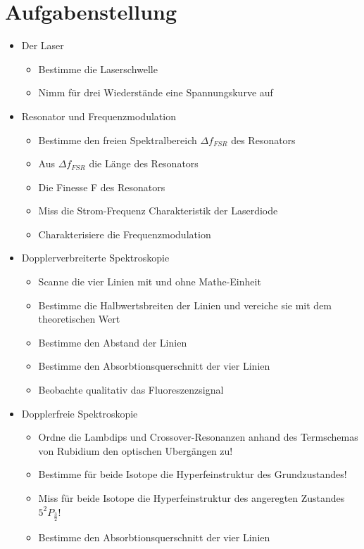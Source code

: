 \documentclass[12pt]{article}
\begin{document}
\section{Aufgabenstellung}
\begin{itemize}
 \item Der Laser
  \begin{itemize}
   \item Bestimme die Laserschwelle 
   \item Nimm für drei Wiederstände eine Spannungskurve auf
  \end{itemize}
 \item Resonator und Frequenzmodulation
  \begin{itemize}
   \item Bestimme den freien Spektralbereich $\Delta f_{FSR}$ des Resonators
   \item Aus $\Delta f_{FSR}$ die Länge des Resonators
   \item Die Finesse F des Resonators
   \item Miss die Strom-Frequenz Charakteristik der Laserdiode
   \item Charakterisiere die Frequenzmodulation
  \end{itemize}
 \item Dopplerverbreiterte Spektroskopie
  \begin{itemize}
   \item Scanne die vier Linien mit und ohne Mathe-Einheit
   \item Bestimme die Halbwertsbreiten der Linien und vereiche sie mit dem theoretischen Wert
   \item Bestimme den Abstand der Linien
   \item Bestimme den Absorbtionsquerschnitt der vier Linien
   \item Beobachte qualitativ das Fluoreszenzsignal
  \end{itemize}
 \item Dopplerfreie Spektroskopie
  \begin{itemize}
   \item Ordne die Lambdips und Crossover-Resonanzen anhand des Termschemas von Rubidium den optischen Ubergängen zu!
   \item Bestimme für beide Isotope die Hyperfeinstruktur des Grundzustandes!
   \item Miss für beide Isotope die Hyperfeinstruktur des angeregten Zustandes $5^2P_{\frac{3}{2}}$!
   \item Bestimme den Absorbtionsquerschnitt der vier Linien

\end{itemize}
\end{itemize}
\end{document}
